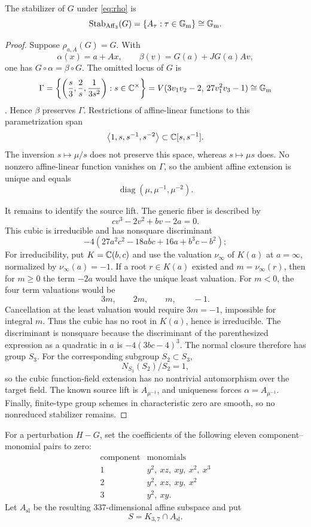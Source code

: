 \documentclass[11pt,reqno]{amsart}
\begin{document}
\begin{proposition}
\label{prop:stabilizer}
The stabilizer of \(G\) under \eqref{eq:rho} is
\[
\operatorname{Stab}_{\operatorname{Aff}_3}(G)
=\left\{A_\tau:\tau\in\mathbb G_{\mathrm m}\right\}\cong\mathbb G_{\mathrm m}.
\]
\end{proposition}

\begin{proof}
Suppose \(\rho_{a,A}(G)=G\).  With
\[
\alpha(x)=a+Ax,\qquad
\beta(v)=G(a)+JG(a)Av,
\]
one has \(G\circ\alpha=\beta\circ G\).  The omitted locus of \(G\) is
\[
\Gamma=\left\{\left(\frac{s}{3},\frac2s,\frac1{3s^2}\right):s\in\mathbb C^\times\right\}
=V(3v_1v_2-2,\,27v_1^2v_3-1)
\cong\mathbb G_{\mathrm m}
\]
\cite{ulam2026counterexample}.  Hence \(\beta\) preserves \(\Gamma\).
Restrictions of affine-linear functions to this parametrization span
\[
\left\langle1,s,s^{-1},s^{-2}\right\rangle\subset\mathbb C[s,s^{-1}].
\]
The inversion \(s\mapsto\mu/s\) does not preserve this space, whereas
\(s\mapsto\mu s\) does.  No nonzero affine-linear function vanishes on
\(\Gamma\), so the ambient affine extension is unique and equals
\[
\operatorname{diag}(\mu,\mu^{-1},\mu^{-2}).
\]

It remains to identify the source lift.  The generic fiber is described by
\[
cv^3-2v^2+bv-2a=0.
\]
This cubic is irreducible and has nonsquare discriminant
\[
-4(27a^2c^2-18abc+16a+b^3c-b^2);
\]
For irreducibility, put \(K=\mathbb C(b,c)\) and use the valuation
\(\nu_\infty\) of \(K(a)\) at \(a=\infty\), normalized by
\(\nu_\infty(a)=-1\).  If a root \(r\in K(a)\) existed and
\(m=\nu_\infty(r)\), then for \(m\ge0\) the term \(-2a\) would have the
unique least valuation.  For \(m<0\), the four term valuations would be
\[
3m,\qquad 2m,\qquad m,\qquad -1.
\]
Cancellation at the least valuation would require \(3m=-1\), impossible
for integral \(m\).  Thus the cubic has no root in \(K(a)\), hence is
irreducible.  The discriminant is nonsquare because the discriminant of the
parenthesized expression as a quadratic in \(a\) is
\(-4(3bc-4)^3\).  The normal closure therefore has group \(S_3\).
For the corresponding subgroup \(S_2\subset S_3\),
\[
N_{S_3}(S_2)/S_2=1,
\]
so the cubic function-field extension has no nontrivial automorphism over
the target field.  The known source lift is \(A_{\mu^{-1}}\), and uniqueness
forces \(\alpha=A_{\mu^{-1}}\).  Finally, finite-type group schemes in
characteristic zero are smooth, so no nonreduced stabilizer remains.
\end{proof}

\begin{definition}
\label{def:slice}
For a perturbation \(H-G\), set the coefficients of the following eleven
component--monomial pairs to zero:
\[
\begin{array}{c|l}
\text{component}&\text{monomials}\\ \hline
1&y^2,\ xz,\ xy,\ x^2,\ x^3\\
2&y^2,\ xz,\ xy,\ x^2\\
3&y^2,\ xy.
\end{array}
\]
Let \(A_{\mathrm{sl}}\) be the resulting 337-dimensional affine subspace and
put
\[
S=K_{3,7}\cap A_{\mathrm{sl}}.
\]
\end{definition}
\end{document}
